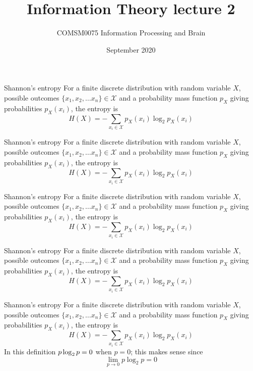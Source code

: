 \documentclass{beamer}
\title[Shannon's Entropy: lecture 2]{Information Theory lecture 2}
\author{COMSM0075 Information Processing and Brain}
\institute{\texttt{comsm0075.github.io}}
\date{September 2020}
\newcommand{\crish}{\color{reddish}}
\newcommand{\cbla}{\color{black}}
\newcommand{\cblu}{\color{blue}}
\newcommand{\sm}{\color{reddish}$}
\newcommand{\fm}{$\color{black}{}}
\begin{document}
\maketitle

\begin{frame}{Shannon's entropy}
  For a finite discrete distribution with random variable \sm X\fm,
  possible outcomes \sm\{x_1,x_2,\ldots x_n\}\in\mathcal{X}\fm{} and a
  probability mass function \sm p_X\fm{} giving probabilities \sm p_X(x_i)\fm, the
  entropy is
\crish
  $$
H(X)=-\sum_{x_i\in \mathcal{X}}{p_X(x_i)\log_2p_X(x_i)}
  $$
\cbla
\end{frame}



\begin{frame}{Shannon's entropy}
  For a finite discrete distribution with random variable \sm X\fm,
  possible outcomes \cblu $\{x_1,x_2,\ldots x_n\}\in\mathcal{X}$\cbla{} and a
  probability mass function \sm p_X\fm{} giving probabilities \sm p_X(x_i)\fm, the
  entropy is
\crish
  $$
H(X)=-\sum_{x_i\in \mathcal{X}}{p_X(x_i)\log_2p_X(x_i)}
  $$
\cbla
\end{frame}


\begin{frame}{Shannon's entropy}
  For a finite discrete distribution with random variable \sm X\fm,
  possible outcomes \sm\{x_1,x_2,\ldots x_n\}\in\mathcal{X}\fm{} and a
  probability mass function \sm p_X\fm{} giving probabilities \cblu$ p_X(x_i)$\cbla, the
  entropy is
\crish
  $$
H(X)=-\sum_{x_i\in \mathcal{X}}{p_X(x_i)\log_2p_X(x_i)}
  $$
\cbla
\end{frame}


\begin{frame}{Shannon's entropy}
  For a finite discrete distribution with random variable \sm X\fm,
  possible outcomes \sm\{x_1,x_2,\ldots x_n\}\in\mathcal{X}\fm{} and a
  probability mass function \sm p_X\fm{} giving probabilities $ p_X(x_i)$\cbla, the
  entropy is
\cblu
  $$
H(X)=-\sum_{x_i\in \mathcal{X}}{p_X(x_i)\log_2p_X(x_i)}
  $$
\cbla
\end{frame}


\begin{frame}{Shannon's entropy}
  For a finite discrete distribution with random variable \sm X\fm,
  possible outcomes \sm\{x_1,x_2,\ldots x_n\}\in\mathcal{X}\fm{} and a
  probability mass function \sm p_X\fm{} giving probabilities \sm p_X(x_i)\fm, the
  entropy is
\crish
  $$
H(X)=-\sum_{x_i\in \mathcal{X}}{p_X(x_i)\log_2p_X(x_i)}
  $$
\cbla
In this definition \sm \cblu p\log_2{p}=0\fm{} when \sm p=0\fm; this makes sense since
\cblu
$$
\lim_{p\rightarrow 0}p\log_2{p}=0
$$
\cbla

\end{frame}
\end{document}
